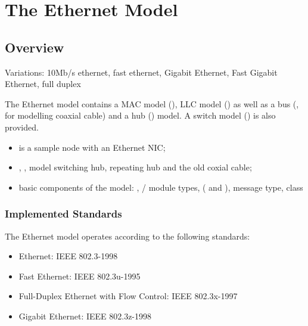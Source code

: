 \chapter{The Ethernet Model}
\label{cha:ethernet}


\section{Overview}

Variations: 10Mb/s ethernet, fast ethernet, Gigabit Ethernet, Fast Gigabit Ethernet, full duplex

The Ethernet model contains a MAC model (), LLC model () as well
as a bus (, for modelling coaxial cable) and a hub () model.
A switch model () is also provided.

\begin{itemize}
  \item {} is a sample node with an Ethernet NIC;
  \item {}, ,  model switching hub, repeating hub and
        the old coxial cable;
  \item basic components of the model: , / module types,
         ( and ),  message type,
         class
\end{itemize}


\subsection{Implemented Standards}

The Ethernet model operates according to the following standards:

\begin{itemize}
  \item Ethernet: IEEE 802.3-1998
  \item Fast Ethernet: IEEE 802.3u-1995
  \item Full-Duplex Ethernet with Flow Control: IEEE 802.3x-1997
  \item Gigabit Ethernet: IEEE 802.3z-1998
\end{itemize}

